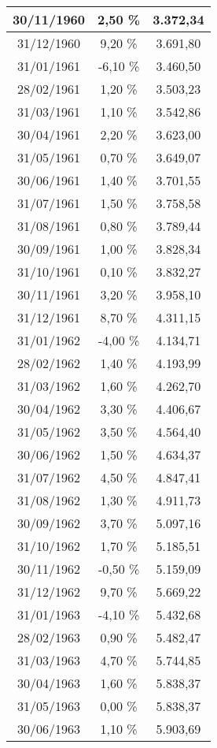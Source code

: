 \begin{center}
\begin{longtable}{|c|c|c|}
30/11/1960 & 2,50 \% & 3.372,34  \\ \hline
31/12/1960 & 9,20 \% & 3.691,80  \\ \hline
31/01/1961 & -6,10 \% & 3.460,50  \\ \hline
28/02/1961 & 1,20 \% & 3.503,23  \\ \hline
31/03/1961 & 1,10 \% & 3.542,86  \\ \hline
30/04/1961 & 2,20 \% & 3.623,00  \\ \hline
31/05/1961 & 0,70 \% & 3.649,07  \\ \hline
30/06/1961 & 1,40 \% & 3.701,55  \\ \hline
31/07/1961 & 1,50 \% & 3.758,58  \\ \hline
31/08/1961 & 0,80 \% & 3.789,44  \\ \hline
30/09/1961 & 1,00 \% & 3.828,34  \\ \hline
31/10/1961 & 0,10 \% & 3.832,27  \\ \hline
30/11/1961 & 3,20 \% & 3.958,10  \\ \hline
31/12/1961 & 8,70 \% & 4.311,15  \\ \hline
31/01/1962 & -4,00 \% & 4.134,71  \\ \hline
28/02/1962 & 1,40 \% & 4.193,99  \\ \hline
31/03/1962 & 1,60 \% & 4.262,70  \\ \hline
30/04/1962 & 3,30 \% & 4.406,67  \\ \hline
31/05/1962 & 3,50 \% & 4.564,40  \\ \hline
30/06/1962 & 1,50 \% & 4.634,37  \\ \hline
31/07/1962 & 4,50 \% & 4.847,41  \\ \hline
31/08/1962 & 1,30 \% & 4.911,73  \\ \hline
30/09/1962 & 3,70 \% & 5.097,16  \\ \hline
31/10/1962 & 1,70 \% & 5.185,51  \\ \hline
30/11/1962 & -0,50 \% & 5.159,09  \\ \hline
31/12/1962 & 9,70 \% & 5.669,22  \\ \hline
31/01/1963 & -4,10 \% & 5.432,68  \\ \hline
28/02/1963 & 0,90 \% & 5.482,47  \\ \hline
31/03/1963 & 4,70 \% & 5.744,85  \\ \hline
30/04/1963 & 1,60 \% & 5.838,37  \\ \hline
31/05/1963 & 0,00 \% & 5.838,37  \\ \hline
30/06/1963 & 1,10 \% & 5.903,69  \\ \hline

\end{longtable}
\end{center}
